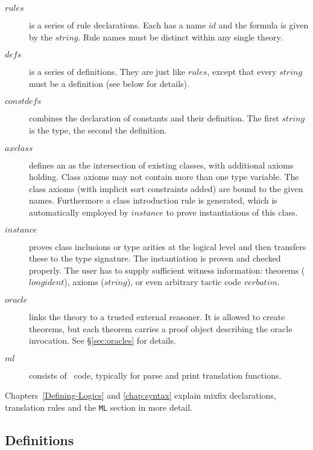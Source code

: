 \begin{description}
\item[$rules$]
  is a series of rule declarations.  Each has a name $id$ and the formula is
  given by the $string$.  Rule names must be distinct within any single
  theory.

\item[$defs$] is a series of definitions.  They are just like $rules$, except
  that every $string$ must be a definition (see below for details).

\item[$constdefs$] combines the declaration of constants and their
  definition. The first $string$ is the type, the second the definition.
  
\item[$axclass$]  defines an
   as the intersection of existing
  classes, with additional axioms holding. Class axioms may not
  contain more than one type variable. The class axioms (with implicit
  sort constraints added) are bound to the given names.  Furthermore a
  class introduction rule is generated, which is automatically
  employed by $instance$ to prove instantiations of this class.
  
\item[$instance$]  proves class inclusions or
  type arities at the logical level and then transfers these to the
  type signature. The instantiation is proven and checked properly.
  The user has to supply sufficient witness information: theorems
  ($longident$), axioms ($string$), or even arbitrary \ML{} tactic
  code $verbatim$.

\item[$oracle$] links the theory to a trusted external reasoner.  It is
  allowed to create theorems, but each theorem carries a proof object
  describing the oracle invocation.  See \S\ref{sec:oracles} for details.

\item[$ml$] 
  consists of \ML\ code, typically for parse and print translation functions.
\end{description}
%
Chapters~\ref{Defining-Logics} and \ref{chap:syntax} explain mixfix
declarations, translation rules and the {\tt ML} section in more detail.


\subsection{Definitions}

